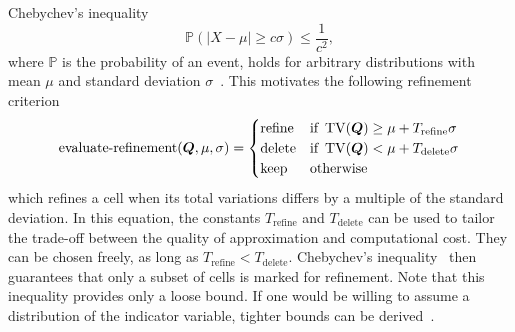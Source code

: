Chebychev's inequality
\begin{equation}
  \label{eq:chebychev}
  \mathbb{P}(\vert X - \mu \vert \geq c \sigma) \leq \frac{1}{c^2},
\end{equation}
where $\mathbb{P}$ is the probability of an event,
holds for arbitrary distributions with mean $\mu$ and standard deviation $\sigma$~\cite{wasserman2004all}.
This motivates the following refinement criterion
\begin{equation}
  \label{eq:refinement-criterion}
  \operatorname{evaluate-refinement}(\bm{Q}, \mu, \sigma) =
  \begin{cases}
    \text{refine} & \text{if } \operatorname{TV}(\bm{Q}) \geq \mu + T_\text{refine} \sigma \\
    \text{delete} & \text{if } \operatorname{TV}(\bm{Q}) < \mu + T_\text{delete} \sigma \\
    \text{keep} & \text{otherwise}
    \end{cases}
\end{equation}
which refines a cell when its total variations differs by a multiple of the standard deviation.
In this equation, the constants $T_\text{refine}$ and $T_\text{delete}$ can be used to tailor the trade-off between the quality of approximation and computational cost.
They can be chosen freely, as long as $T_\text{refine} < T_\text{delete}$.
Chebychev's inequality~ then guarantees that only a subset of cells is marked for refinement.
Note that this inequality provides only a loose bound.
If one would be willing to assume a distribution of the indicator variable, tighter bounds can be derived~\cite{wasserman2004all}.

